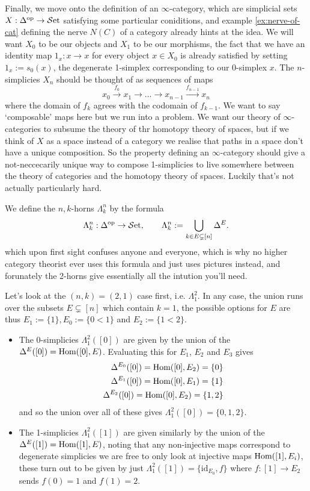 Finally, we move onto the definition of an $\infty$-category, which are simplicial sets $X : \Delta^\text{op} \to {\mathcal{S}\text{et}}$ satisfying some particular coniditions, and example \ref{ex:nerve-of-cat} defining the nerve $N(C)$ of a category already hints at the idea. We will want $X_0$ to be our objects and $X_1$ to be our morphisms, the fact that we have an identity map $1_x : x \to x$ for every object $x \in X_0$ is already satisfied by setting $1_x := s_0(x)$, the degenerate 1-simplex corresponding to our 0-simplex $x$. The $n$-simplicies $X_n$ should be thought of as sequences of maps
	\[
	x_0 \xrightarrow{f_0} x_1 \to \dots \to x_{n-1} \xrightarrow{f_{n-1}} x_n
	\]
	where the domain of $f_k$ agrees with the codomain of $f_{k-1}$. We want to say `composable' maps here but we run into a problem. We want our theory of $\infty$-categories to subsume the theory of thr homotopy theory of spaces, but if we think of $X$ as a space instead of a category we realise that paths in a space don't have a unique composition. So the property defining an $\infty$-category should give a not-neccecarily unique way to compose 1-simplicies to live somewhere between the theory of categories and the homotopy theory of spaces. Luckily that's not actually particularly hard.

We define the $n,k$-horns $\Lambda^n_k$ by the formula 
	\[
	\Lambda^n_k : \Delta^\text{op} \to {\mathcal{S}\text{et}},
	\qquad
	\Lambda^n_k := \bigcup_{k \in E \subsetneq [n]} \Delta^E.
	\]
which upon first sight confuses anyone and everyone, which is why no higher category theorist ever uses this formula and just uses pictures instead, and forunately the 2-horns give essentially all the intution you'll need.

Let's look at the $(n,k) = (2,1)$ case first, i.e. $\Lambda^2_1$. In any case, the union runs over the subsets $E \subsetneq [n]$ which contain $k=1$, the possible options for $E$ are thus $E_1 := \{1\}, E_0 := \{0<1\}$ and $E_2 := \{1<2\}$.
\begin{itemize}
	\item{
	The 0-simplicies $\Lambda^2_1([0])$ are given by the union of the $\Delta^E([0]) = {\text{Hom}}([0],E)$.
	Evaluating this for $E_1$, $E_2$ and $E_3$ gives
		\begin{align*}
			\Delta^{E_0}([0]) = {\text{Hom}}([0],E_2) = \{0\} \\
			\Delta^{E_1}([0]) = {\text{Hom}}([0],E_1) = \{1\} \\
			\Delta^{E_2}([0]) = {\text{Hom}}([0],E_2) = \{1,2\}
		\end{align*}
	and so the union over all of these gives $\Lambda^2_1([0]) = \{0,1,2\}$. 
	}
	\item{
	The 1-simplicies $\Lambda^2_1([1])$ are given similarly by the union of the $\Delta^E([1]) = {\text{Hom}}([1],E)$, noting that any non-injective maps correspond to degenerate simplicies we are free to only look at injective maps ${\text{Hom}}([1],E_i)$, these turn out to be given by just $\Lambda^2_1([1]) = \{\text{id}_{E_0}, f\}$ where $f : [1] \to E_2$ sends $f(0)=1$ and $f(1)=2$. 
	}
\end{itemize}

